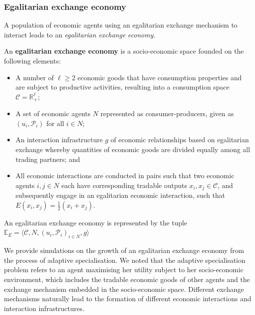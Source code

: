 \subsubsection{Egalitarian exchange economy}

A population of economic agents using an egalitarian exchange mechanism to interact leads to an \emph{egalitarian exchange economy}.

\begin{definition}
An \textbf{egalitarian exchange economy} is a socio-economic space founded on the following elements:
\begin{itemize}
	\item A number of $\ell \geqslant 2$ economic goods that have consumption properties and are subject to productive activities, resulting into a consumption space $\mathcal{C} = \mathbb{R}^{\ell}_{+}$;

	\item A set of economic agents $N$ represented as consumer-producers, given as $\left( u_{i}, \mathcal{P}_{i} \right)$ for all $i \in N$;

	\item An interaction infrastructure $g$ of economic relationships based on egalitarian exchange whereby quantities of economic goods are divided equally among all trading partners; and

	\item All economic interactions are conducted in pairs such that two economic agents $i,j \in N$ each have corresponding tradable outputs $x_{i}, x_{j} \in \mathcal{C}$, and subsequently engage in an egalitarian economic interaction, such that $E(x_{i}, x_{j}) = \frac{1}{2} \left( x_{i} + x_{j} \right)$.
\end{itemize}
An egalitarian exchange economy is represented by the tuple $\mathbb{E}_{E} = \big \langle \mathcal{C}, N, (u_{i}, \mathcal{P}_{i})_{i \in N}, g \big \rangle$
\end{definition}

We provide simulations on the growth of an egalitarian exchange economy from the process of adaptive specialisation. We noted that the adaptive specialisation problem refers to an agent maximising her utility subject to her socio-economic environment, which includes the tradable economic goods of other agents and the exchange mechanism embedded in the socio-economic space. Different exchange mechanisms naturally lead to the formation of different economic interactions and interaction infrastructures.

